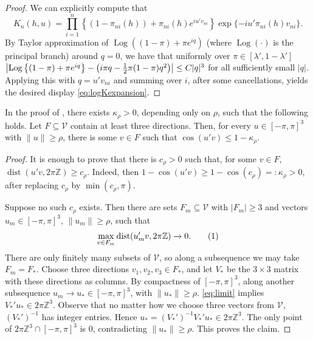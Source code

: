 \documentclass[12pt,reqno]{amsart}
\DeclareMathOperator{\dist}{dist} %
\DeclareMathOperator{\Log}{Log} %
\begin{document}
\begin{proof}
We can explicitly compute that
\[
K_n(h,u)
=
\prod_{i=1}^n
\left\{(1-\pi_{ni}(h))+\pi_{ni}(h)e^{iu'v_{ni}}\right\}
\exp\{-iu'\pi_{ni}(h)v_{ni}\}.
\]
	By Taylor approximation of $\Log((1-\pi) + \pi e^{i q})$ (where $\Log(\cdot)$ is the
	principal branch) around $q = 0$, we have that uniformly over $\pi \in [\lambda',
	1-\lambda']$
	\(
		\abs[\big]{
			\Log\br{(1-\pi) + \pi e^{iq}} - \pr{i\pi q - \frac{1}{2} \pi(1-\pi) q^2
		}}\le C |q|^3
	\)
	for all sufficiently small $|q|$.
	Applying this with $q = u'v_{ni}$ and summing over $i$, after some cancellations,
	yields the desired display
	\eqref{eq:logKexpansion}.
\end{proof}

\begin{lem}\label{lem:frequent-separated}
In the proof of ,  there exists \(\kappa_\rho>0\), depending only on \(\rho\), such
that the following holds.  Let \(F\subseteq\mathcal V\) contain at least three
directions.  Then, for every \(u\in[-\pi,\pi]^3\) with \(\|u\|\ge\rho\), there is
some \(v\in F\) such that \(\cos(u'v)\le 1-\kappa_\rho\).
\end{lem}

\begin{proof}
It is enough to prove that there is \(c_\rho>0\) such that, for some \(v\in F\),
\(
\dist(u'v,2\pi\mathbb Z)\ge c_\rho.
\)
Indeed, then \(1-\cos(u'v)\ge 1-\cos(c_\rho)=:\kappa_\rho>0\), after replacing
\(c_\rho\) by \(\min(c_\rho,\pi)\).

Suppose no such \(c_\rho\) exists.  Then there are sets \(F_m\subseteq\mathcal V\)
with \(|F_m|\ge3\) and vectors \(u_m\in[-\pi,\pi]^3\), \(\|u_m\|\ge\rho\), such
that
\[
\max_{v\in F_m}\dist(u_m'v,2\pi\mathbb Z)\to0. \numberthis \label{eq:limit}
\]
There are only finitely many subsets of \(\mathcal V\), so along a subsequence
we may take \(F_m=F_*\).  Choose three directions \(v_1,v_2,v_3\in F_*\), and
let \(V_*\) be the \(3\times3\) matrix with these directions as columns.  By
compactness of $[-\pi, \pi]^3$, along another subsequence \(u_m\to u_*\in[-\pi,\pi]^3\),
with
\(\|u_*\|\ge\rho\). \eqref{eq:limit} implies
\(
V_*'u_*\in 2\pi\mathbb Z^3.
\)
Observe that no matter how we choose three vectors from $\mathcal V$,
\((V_*')^{-1}\) has integer entries.  Hence
\(
u_*=(V_*')^{-1}V_*'u_*\in2\pi\mathbb Z^3.
\)
The only point of \(2\pi\mathbb Z^3\cap[-\pi,\pi]^3\) is \(0\), contradicting
\(\|u_*\|\ge\rho\).  This proves the claim.
\end{proof}
\end{document}
